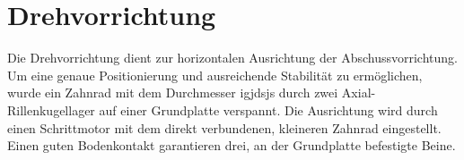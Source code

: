 \section{Drehvorrichtung}
Die Drehvorrichtung dient zur horizontalen Ausrichtung der Abschussvorrichtung. Um eine genaue Positionierung und ausreichende Stabilität zu ermöglichen, wurde ein Zahnrad mit dem Durchmesser igjdsjs durch zwei Axial-Rillenkugellager auf einer Grundplatte verspannt. Die Ausrichtung wird durch einen Schrittmotor mit dem direkt verbundenen, kleineren Zahnrad eingestellt. Einen guten Bodenkontakt garantieren drei, an der Grundplatte befestigte Beine.